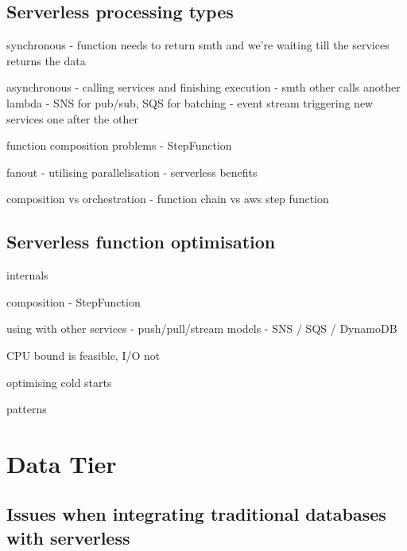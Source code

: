 \subsection{Serverless processing types}


synchronous - function needs to return smth and we're waiting till the services returns the data

asynchronous - calling services and finishing execution - smth other calls another lambda - SNS for pub/sub, SQS for batching - event stream triggering new services one after the other

function composition problems - StepFunction

fanout - utilising parallelisation - serverless benefits

composition vs orchestration - function chain vs aws step function


\subsection{Serverless function optimisation}

internals

composition - StepFunction

using with other services - push/pull/stream models - SNS / SQS / DynamoDB

CPU bound is feasible, I/O not

optimising cold starts

patterns

\section{Data Tier}

\subsection{Issues when integrating traditional databases with serverless}

